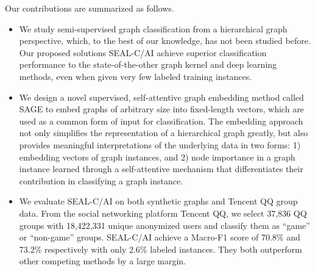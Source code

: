 \documentclass[sigconf]{acmart}
\newcommand{\eat}[1]{}
\begin{document}
\eat{
In all, in this work, we formulate a new problem named semi-supervised graph classification on a hierarchical graph. We propose a new framework, named \underline{SE}mi-superivsed gr\underline{A}ph c\underline{L}assification via \underline{C}autious/\underline{A}ctive Iteration (SEAL-C/AI), where "cautious" feeds to the scenario in which active learning is not available. In SEAL-C/AI, we first embed an arbitrary size of graph instance into a fixed-size embedding vector by the limited labeled instances at hand, then hierarchical graph is exploited. Based on the predictions of the two classifiers IC and HC, a candidate set is selected and committed to be "trustworthy". These "trustworthy" instances are utilized to update the graph embedding obtained in the previous iteration.

It is an iteration framework and the iteration finalizes if a pre-defined condition is certificated. To evaluate SEAL-C/AI, we implement it and apply it to both synthetic and real datasets. The real dataset is collected from the real online social network platform Tencent QQ, which has more than 800 million users and around 100 million online groups, from which we select nearly 40 thousand online groups and distinguish "game" groups from "non-game" groups.
}


Our contributions are summarized as follows.

\begin{itemize}
\item We study semi-supervised graph classification from a hierarchical graph perspective, which, to the best of our knowledge, has not been studied before.  Our proposed solutions SEAL-C/AI achieve superior classification performance to the state-of-the-other graph kernel and deep learning methods, even when given very few labeled training instances.



\item We design a novel supervised, self-attentive graph embedding method called SAGE to embed graphs of arbitrary size into fixed-length vectors, which are used as a common form of input for classification.  The embedding approach not only simplifies the representation of a hierarchical graph greatly, but also provides meaningful interpretations of the underlying data in two forms: 1) embedding vectors of graph instances, and 2) node importance in a graph instance learned through a self-attentive mechanism that differentiates their contribution in classifying a graph instance.

\item We evaluate SEAL-C/AI on both synthetic graphs and Tencent QQ group data.  From the social networking platform Tencent QQ, we select 37,836 QQ groups with 18,422,331 unique anonymized users and classify them as ``game'' or ``non-game'' groups.  SEAL-C/AI achieve a Macro-F1 score of 70.8\% and 73.2\% respectively with only 2.6\% labeled instances.  They both outperform other competing methods by a large margin.
\end{itemize}
\end{document}
